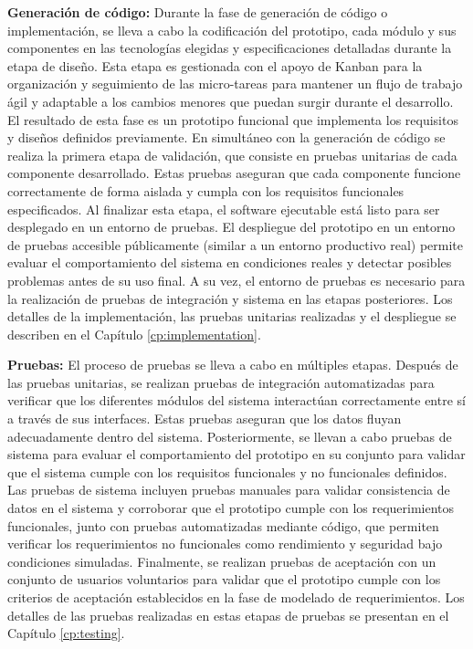 \textbf{Generación de código:}
Durante la fase de generación de código o implementación, se lleva a cabo la codificación del prototipo, cada módulo y sus componentes en las tecnologías elegidas y especificaciones detalladas durante la etapa de diseño.
Esta etapa es gestionada con el apoyo de Kanban para la organización y seguimiento de las micro-tareas para mantener un flujo de trabajo ágil y adaptable a los cambios menores que puedan surgir durante el desarrollo.
El resultado de esta fase es un prototipo funcional que implementa los requisitos y diseños definidos previamente.
En simultáneo con la generación de código se realiza la primera etapa de validación, que consiste en pruebas unitarias de cada componente desarrollado.
Estas pruebas aseguran que cada componente funcione correctamente de forma aislada y cumpla con los requisitos funcionales especificados.
Al finalizar esta etapa, el software ejecutable está listo para ser desplegado en un entorno de pruebas. El despliegue del prototipo en un entorno de pruebas accesible públicamente (similar a un entorno productivo real) permite evaluar el comportamiento del sistema en condiciones reales y detectar posibles problemas antes de su uso final. A su vez, el entorno de pruebas es necesario para la realización de pruebas de integración y sistema en las etapas posteriores.
Los detalles de la implementación, las pruebas unitarias realizadas y el despliegue se describen en el Capítulo \ref{cp:implementation}.

\textbf{Pruebas:}
El proceso de pruebas se lleva a cabo en múltiples etapas.
Después de las pruebas unitarias, se realizan pruebas de integración automatizadas para verificar que los diferentes módulos del sistema interactúan correctamente entre sí a través de sus interfaces.
Estas pruebas aseguran que los datos fluyan adecuadamente dentro del sistema.
Posteriormente, se llevan a cabo pruebas de sistema para evaluar el comportamiento del prototipo en su conjunto para validar que el sistema cumple con los requisitos funcionales y no funcionales definidos.
Las pruebas de sistema incluyen pruebas manuales para validar consistencia de datos en el sistema y corroborar que el prototipo cumple con los requerimientos funcionales, junto con pruebas automatizadas mediante código, que permiten verificar los requerimientos no funcionales como rendimiento y seguridad bajo condiciones simuladas.
Finalmente, se realizan pruebas de aceptación con un conjunto de usuarios voluntarios para validar que el prototipo cumple con los criterios de aceptación establecidos en la fase de modelado de requerimientos.
Los detalles de las pruebas realizadas en estas etapas de pruebas se presentan en el Capítulo \ref{cp:testing}.

